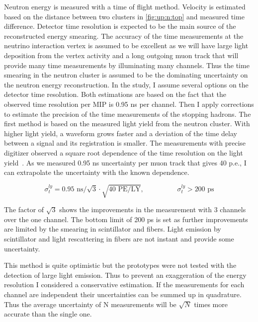 \documentclass[main.tex]{subfiles}
\begin{document}
Neutron energy is measured with a time of flight method. Velocity is estimated based on the distance between two clusters in \autoref{fig:up:n:top} and measured time difference. Detector time resolution is expected to be the main source of the reconstructed energy smearing. The accuracy of the time measurements at the neutrino interaction vertex is assumed to be excellent as we will have large light deposition from the vertex activity and a long outgoing muon track that will provide many time measurements by illuminating many channels. Thus the time smearing in the neutron cluster is assumed to be the dominating uncertainty on the neutron energy reconstruction. In the study, I assume several options on the detector time resolution. Both estimations are based on the fact that the observed time resolution per MIP is 0.95 ns per channel. Then I apply corrections to estimate the precision of the time measurements of the stopping hadrons. The first method is based on the measured light yield from the neutron cluster. With higher light yield, a waveform grows faster and a deviation of the time delay between a signal and its registration is smaller. The measurements with precise digitizer observed a square root dependence of the time resolution on the light yield~\cite{Niemann2010}. As we measured 0.95 ns uncertainty per muon track that gives 40 p.e., I can extrapolate the uncertainty with the known dependence.

\begin{equation}
\label{eq:up:n:ly}
	\sigma^{ly}_t=0.95\text{ ns}/\sqrt{3}\cdot\sqrt{40 \text{ PE/LY}}, \hspace{2cm} \sigma^{ly}_t>200\text{ ps}
\end{equation}

The factor of $\sqrt{3}$ shows the improvements in the measurement with 3 channels over the one channel. The bottom limit of 200 ps is set as further improvements are limited by the smearing in scintillator and fibers. Light emission by scintillator and light rescattering in fibers are not instant and provide some uncertainty.

This method is quite optimistic but the prototypes were not tested with the detection of large light emission. Thus to prevent an exaggeration of the energy resolution I considered a conservative estimation. If the measurements for each channel are independent their uncertainties can be summed up in quadrature. Thus the average uncertainty of N measurements will be $\sqrt{N}$ times more accurate than the single one.
\end{document}
